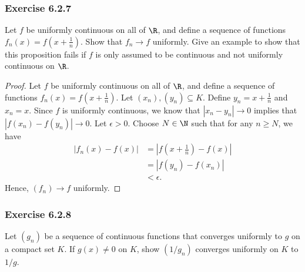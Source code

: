 \subsubsection{Exercise 6.2.7} Let \( f  \) be uniformly continuous on all of \( \R  \), and define a sequence of functions \( f_n(x) = f(x+ \frac{ 1 }{ n } ) \). Show that \( f_n \to f  \) uniformly. Give an example to show that this proposition fails if \( f  \) is only assumed to be continuous and not uniformly continuous on \( \R  \).

\begin{proof}
Let \( f  \) be uniformly continuous on all of \( \R  \), and define a sequence of functions \( f_n(x) = f(x+ \frac{ 1 }{ n } )   \). Let \( (x_n), (y_n) \subseteq K  \). Define \( y_n = x + \frac{ 1 }{ n }  \) and \( x_n = x  \). Since \( f  \) is uniformly continuous, we know that \( | x_n - y_n | \to 0   \) implies that \( | f(x_n) - f(y_n)  | \to 0  \). Let \( \epsilon > 0  \). Choose \( N \in \N  \) such that for any \( n \geq N  \), we have 
\begin{align*}
    | f_n(x) - f(x)  | &= | f(x + \frac{ 1 }{ n } ) - f(x) |  \\
                       &= | f(y_n) - f(x_n)   | \\
                       &< \epsilon.
\end{align*}
Hence, \( (f_n) \to f  \) uniformly.
\end{proof}


\subsubsection{Exercise 6.2.8} Let \( (g_n)  \) be a sequence of continuous functions that converges uniformly to \( g  \) on a compact set \( K  \). If \( g(x) \neq 0  \) on \( K  \), show \( (1/g_n) \) converges uniformly on \( K  \) to \( 1/g \).

